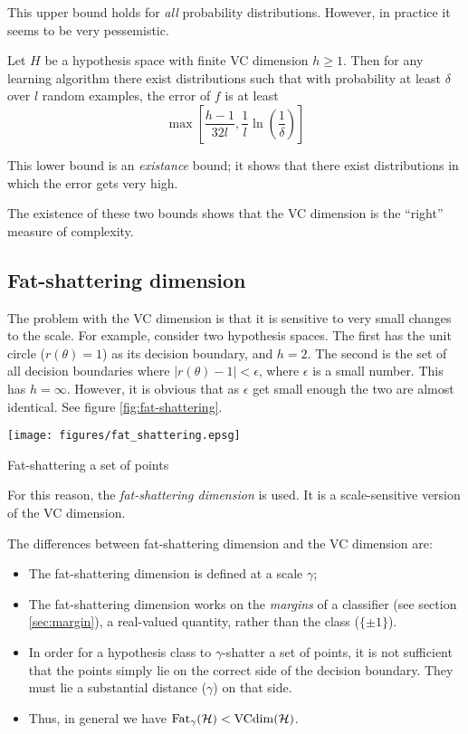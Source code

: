 This upper bound holds for \emph{all} probability distributions.
However, in practice it seems to be very pessemistic.

\begin{theorem}
Let $H$ be a hypothesis space with finite VC dimension $h \geq 1$.
Then for any learning algorithm there exist distributions such that
with probability at least $\delta$ over $l$ random examples, the error
of $f$ is at least
\begin{equation}
\max \left[ \frac{h-1}{32l}, \frac{1}{l} \ln \left( \frac{1}{\delta}
\right) \right]
\end{equation}
\end{theorem}

This lower bound is an \emph{existance} bound; it shows that there
exist distributions in which the error gets very high.

The existence of these two bounds shows that the VC dimension is the
``right'' measure of complexity.  


\subsection{Fat-shattering dimension}


The problem with the VC dimension is that it is sensitive to very
small changes to the scale.  For example, consider two hypothesis
spaces.  The first has the unit circle ($r(\theta) = 1$) as its decision
boundary, and $h = 2$.  The second is the set of all decision
boundaries where $|r(\theta) - 1| < \epsilon$, where $\epsilon$ is a
small number.  This has $h = \infty$.  However, it is obvious that as
$\epsilon$ get small enough the two are almost identical.  See figure
\ref{fig:fat-shattering}.

\begin{linefigure}
\begin{center}
\texttt{[image: figures/fat\_shattering.epsg]}
\end{center}
\caption{Fat-shattering a set of points}
\label{fig:fat-shattering}
\end{linefigure}


For this reason, the \emph{fat-shattering dimension} is used.  It
is a scale-sensitive version of the VC dimension.

The differences between fat-shattering dimension and the VC dimension
are:
\begin{itemize}
\item	The fat-shattering dimension is defined at a scale $\gamma$;
\item	The fat-shattering dimension works on the \emph{margins} of a
	classifier (see section \ref{sec:margin}), a real-valued
	quantity, rather than the class ($\{\pm 1\}$).
\item	In order for a hypothesis class to $\gamma$-shatter a set of
	points, it is not sufficient that the points simply lie on the
	correct side of the decision boundary.  They must lie a
	substantial distance ($\gamma$) on that side.
\item	Thus, in general we have $\mathrm{Fat}_{\gamma}(\mathcal{H}) <
	\mathrm{VCdim}(\mathcal{H})$.
\end{itemize}

